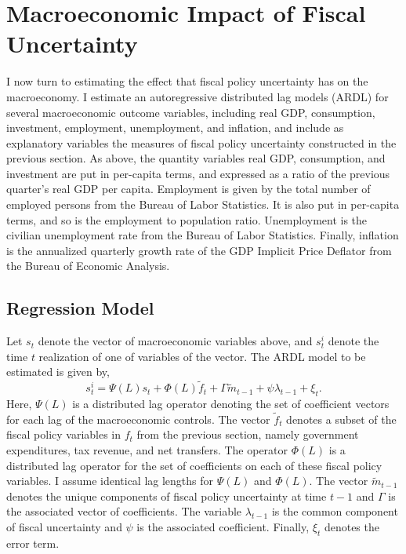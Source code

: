 \documentclass[11pt]{article}
\newcommand{\beq}{\begin{equation}}
\newcommand{\eeq}{\end{equation}}
\begin{document}
\section{Macroeconomic Impact of Fiscal Uncertainty}
I now turn to estimating the effect that fiscal policy uncertainty has on the macroeconomy.  I estimate an autoregressive distributed lag models (ARDL) for several macroeconomic outcome variables, including real GDP, consumption, investment, employment, unemployment, and inflation, and include as explanatory variables the measures of fiscal policy uncertainty constructed in the previous section.  As above, the quantity variables real GDP, consumption, and investment are put in per-capita terms, and expressed as a ratio of the previous quarter's real GDP per capita.  Employment is given by the total number of employed persons from the Bureau of Labor Statistics.  It is also put in per-capita terms, and so is the employment to population ratio.  Unemployment is the civilian unemployment rate from the Bureau of Labor Statistics.  Finally, inflation is the annualized quarterly growth rate of the GDP Implicit Price Deflator from the Bureau of Economic Analysis.

\subsection{Regression Model}
Let $s_t$ denote the vector of macroeconomic variables above, and $s_t^i$ denote the time $t$ realization of one of variables of the vector.  The ARDL model to be estimated is given by,
\beq \label{eg:ardl} s_t^i = \Psi(L)s_t + \Phi(L)\tilde{f}_t + \Gamma \tilde{m}_{t-1} + \psi \lambda_{t-1} + \xi_t. \eeq
Here, $\Psi(L)$ is a distributed lag operator denoting the set of coefficient vectors for each lag of the macroeconomic controls.  The vector $\tilde{f}_t$ denotes a subset of the fiscal policy variables in $f_t$ from the previous section, namely government expenditures, tax revenue, and net transfers.  The operator $\Phi(L)$ is a distributed lag operator for the set of coefficients on each of these fiscal policy variables.  I assume identical lag lengths for $\Psi(L)$ and $\Phi(L)$.  The vector $\tilde{m}_{t-1}$ denotes the unique components of fiscal policy uncertainty at time $t-1$ and $\Gamma$ is the associated vector of coefficients.  The variable $\lambda_{t-1}$ is the common component of fiscal uncertainty and $\psi$ is the associated coefficient.  Finally, $\xi_t$ denotes the error term.  




\end{document}
